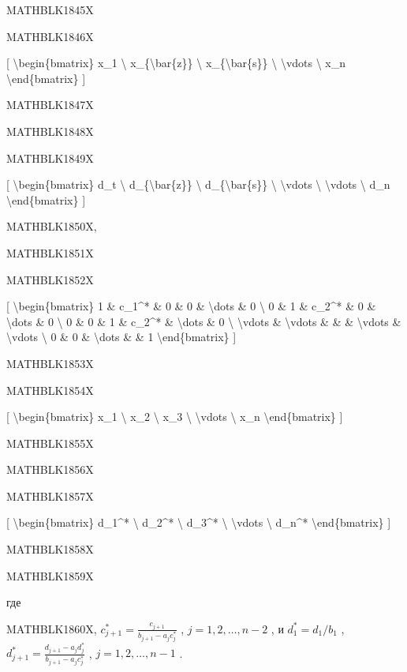 \documentclass[
]{article}
\begin{document}
MATHBLK1845X

MATHBLK1846X

{[} \textbackslash begin\{bmatrix\} x\_1 \textbackslash{}
x\_\{\textbackslash bar\{z\}\} \textbackslash{}
x\_\{\textbackslash bar\{s\}\} \textbackslash{} \textbackslash vdots
\textbackslash{} x\_n \textbackslash end\{bmatrix\} {]}

MATHBLK1847X

MATHBLK1848X

MATHBLK1849X

{[} \textbackslash begin\{bmatrix\} d\_t \textbackslash{}
d\_\{\textbackslash bar\{z\}\} \textbackslash{}
d\_\{\textbackslash bar\{s\}\} \textbackslash{} \textbackslash vdots
\textbackslash{} \textbackslash vdots \textbackslash{} d\_n
\textbackslash end\{bmatrix\} {]}

MATHBLK1850X,

MATHBLK1851X

MATHBLK1852X

{[} \textbackslash begin\{bmatrix\} 1 \& c\_1\^{}* \& 0 \& 0 \&
\textbackslash dots \& 0 \textbackslash{} 0 \& 1 \& c\_2\^{}* \& 0 \&
\textbackslash dots \& 0 \textbackslash{} 0 \& 0 \& 1 \& c\_2\^{}* \&
\textbackslash dots \& 0 \textbackslash{} \textbackslash vdots \&
\textbackslash vdots \& \& \& \textbackslash vdots \&
\textbackslash vdots \textbackslash{} 0 \& 0 \& \textbackslash dots \&
\& 1 \textbackslash end\{bmatrix\} {]}

MATHBLK1853X

MATHBLK1854X

{[} \textbackslash begin\{bmatrix\} x\_1 \textbackslash{} x\_2
\textbackslash{} x\_3 \textbackslash{} \textbackslash vdots
\textbackslash{} x\_n \textbackslash end\{bmatrix\} {]}

MATHBLK1855X

MATHBLK1856X

MATHBLK1857X

{[} \textbackslash begin\{bmatrix\} d\_1\^{}* \textbackslash{} d\_2\^{}*
\textbackslash{} d\_3\^{}* \textbackslash{} \textbackslash vdots
\textbackslash{} d\_n\^{}* \textbackslash end\{bmatrix\} {]}

MATHBLK1858X

MATHBLK1859X

где

MATHBLK1860X, \(c_{j+1}^* = \frac{c_{j+1}}{b_{j+1} - a_j c_j^*}\) ,
\(j = 1, 2, \ldots, n-2\) , и \(d_1^* = d_1/b_1\) ,
\(d_{j+1}^* = \frac{d_{j+1} - a_j d_j^*}{b_{j+1} - a_j c_j^*}\) ,
\(j = 1, 2, \ldots, n-1\) .
\end{document}
